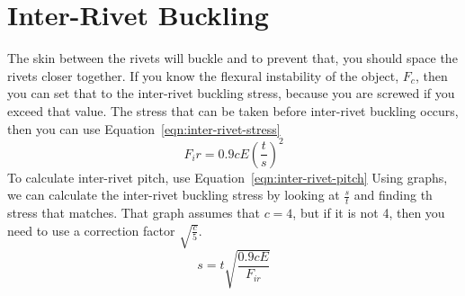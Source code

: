 \documentclass{article}
\begin{document}
\section{Inter-Rivet Buckling}
The skin between the rivets will buckle and to prevent that, you should space the rivets closer together.
If you know the flexural instability of the object, $F_c$, then you can set that to the inter-rivet buckling stress, because you are screwed if you exceed that value.
The stress that can be taken before inter-rivet buckling occurs, then you can use Equation~\ref{eqn:inter-rivet-stress}
\begin{equation}\label{eqn:inter-rivet-stress}
    F_ir = 0.9cE\left(\frac{t}{s}\right) ^ 2
\end{equation}
To calculate inter-rivet pitch, use Equation~\ref{eqn:inter-rivet-pitch}
Using graphs, we can calculate the inter-rivet buckling stress by looking at $\frac{s}{t}$ and finding th stress that matches.
That graph assumes that $c=4$, but if it is not 4, then you need to use a correction factor $\sqrt{\frac{c}{5}}$.
\begin{equation}\label{eqn:inter-rivet-pitch}
   s = t\sqrt{\frac{0.9cE}{F_{ir}}} 
\end{equation}
\end{document}
